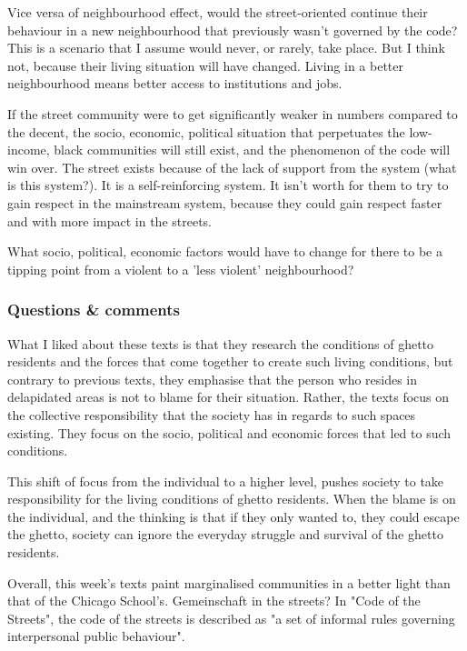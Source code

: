 \documentclass{article}
\begin{document}
\begin{outline}
	\1 Vice versa of neighbourhood effect, would the street-oriented continue their behaviour in a new neighbourhood that previously wasn't governed by the code? This is a scenario that I assume would never, or rarely, take place. But I think not, because their living situation will have changed. Living in a better neighbourhood means better access to institutions and jobs.
	
		\1 If the street community were to get significantly weaker in numbers compared to the decent, the socio, economic, political situation that perpetuates the low-income, black communities will still exist, and the phenomenon of the code will win over. The street exists because of the lack of support from the system (what is this system?). It is a self-reinforcing system. It isn't worth for them to try to gain respect in the mainstream system, because they could gain respect faster and with more impact in the streets.
	
	\1 What socio, political, economic factors would have to change for there to be a tipping point from a violent to a 'less violent' neighbourhood?		

\end{outline}
		
\subsubsection{Questions \& comments}

\begin{outline}
	\1  What I liked about these texts is that they research the conditions of ghetto residents and the forces that come together to create such living conditions, but contrary to previous texts, they emphasise that the person who resides in delapidated areas is not to blame for their situation. Rather, the texts focus on the collective responsibility that the society has in regards to such spaces existing. They focus on the socio, political and economic forces that led to such conditions.

This shift of focus from the individual to a higher level, pushes society to take responsibility for the living conditions of ghetto residents. When the blame is on the individual, and the thinking is that if they only wanted to, they could escape the ghetto, society can ignore the everyday struggle and survival of the ghetto residents.

Overall, this week's texts paint marginalised communities in a better light than that of the Chicago School's.
	\1 Gemeinschaft in the streets? 
		\2 In "Code of the Streets", the code of the streets is described as "a set of informal rules governing interpersonal public behaviour".
	\1
\end{outline}
\end{document}
